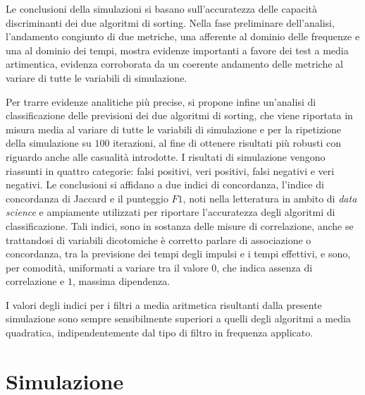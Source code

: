 \documentclass[9pt,twocolumn,twoside]{osajnl}
\begin{document}
Le conclusioni della simulazioni si basano sull'accuratezza delle capacità discriminanti dei due algoritmi di sorting. Nella fase preliminare dell'analisi, l'andamento congiunto di due metriche, una afferente al dominio delle frequenze e una al dominio dei tempi, mostra evidenze importanti a favore dei test a media artimentica, evidenza corroborata da un coerente andamento delle metriche al variare di tutte le variabili di simulazione.

Per trarre evidenze analitiche più precise, si propone infine un'analisi di classificazione delle previsioni dei due algoritmi di sorting, che viene riportata in misura media al variare di tutte le variabili di simulazione e per la ripetizione della simulazione su $100$ iterazioni, al fine di ottenere risultati più robusti con riguardo anche alle casualità introdotte. I risultati di simulazione vengono riassunti in quattro categorie: falsi positivi, veri positivi, falsi negativi e veri negativi. Le conclusioni si affidano a due indici di concordanza, l'indice di concordanza di Jaccard e il punteggio $F1$, noti nella letteratura in ambito di {\it data science} e ampiamente utilizzati per riportare l'accuratezza degli algoritmi di classificazione. Tali indici, sono in sostanza delle misure di correlazione, anche se trattandosi di variabili dicotomiche è corretto parlare di associazione o concordanza, tra la previsione dei tempi degli impulsi e i tempi effettivi, e sono, per comodità, uniformati a variare tra il valore $0$, che indica assenza di correlazione e $1$, massima dipendenza. 

I valori degli indici per i filtri a media aritmetica risultanti dalla presente simulazione sono sempre sensibilmente superiori a quelli degli algoritmi a media quadratica, indipendentemente dal tipo di filtro in frequenza applicato.



% 



\section{Simulazione}
\label{sec:examples}
\end{document}
